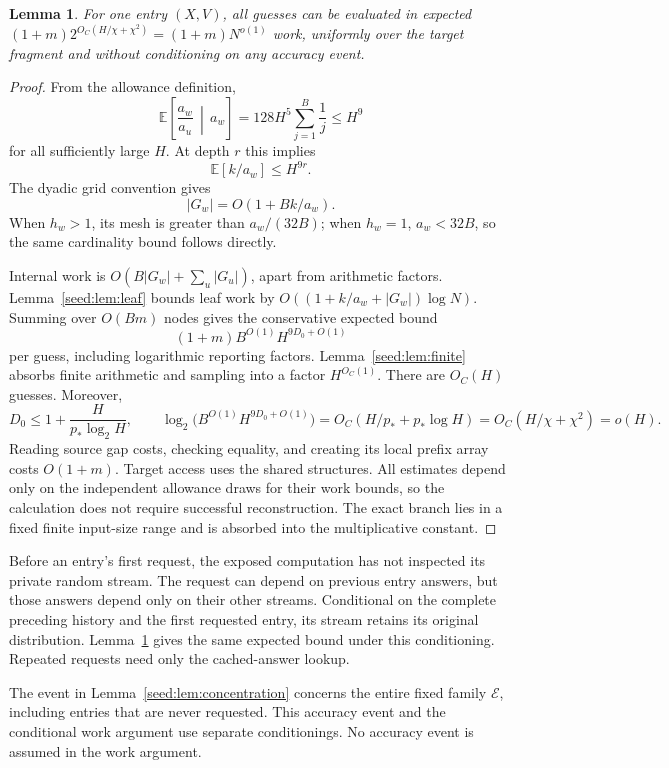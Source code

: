\documentclass[11pt]{article}
\newtheorem{lemma}[theorem]{Lemma}
\theoremstyle{definition}
\newcommand{\E}{\mathbb E}
\newcommand{\1}{\mathbf 1}
\begin{document}
\begin{lemma}\label{seed:lem:work}
For one entry $(X,V)$, all guesses can be evaluated in expected
$(1+m)2^{O_C(H/\chi+\chi^2)}=(1+m)N^{o(1)}$ work, uniformly over the
target fragment and without conditioning on any accuracy event.
\end{lemma}
\begin{proof}
From the allowance definition,
\[
 \E\left[\frac{a_w}{a_u}\,\middle|\,a_w\right]
 =128H^5\sum_{j=1}^B\frac1j\le H^9
\]
for all sufficiently large $H$. At depth $r$ this implies
\[
 \E[k/a_w]\le H^{9r}.
\]
The dyadic grid convention gives
\[
 |G_w|=O(1+Bk/a_w).
\]
When $h_w>1$, its mesh is greater than $a_w/(32B)$; when $h_w=1$,
$a_w<32B$, so the same cardinality bound follows directly.

Internal work is $O(B|G_w|+\sum_u|G_u|)$, apart from arithmetic factors.
Lemma~\ref{seed:lem:leaf} bounds leaf work by
$O((1+k/a_w+|G_w|)\log N)$. Summing over $O(Bm)$ nodes gives the
conservative expected bound
\[
 (1+m)B^{O(1)}H^{9D_0+O(1)}
\]
per guess, including logarithmic reporting factors.
Lemma~\ref{seed:lem:finite} absorbs finite arithmetic and sampling into
a factor $H^{O_C(1)}$. There are $O_C(H)$ guesses.
Moreover,
\[
 D_0\le1+\frac{H}{p_*\log_2 H},\qquad
 \log_2\bigl(B^{O(1)}H^{9D_0+O(1)}\bigr)
 =O_C(H/p_*+p_*\log H)
 =O_C(H/\chi+\chi^2)=o(H).
\]
Reading source gap costs, checking equality, and creating its local
prefix array costs $O(1+m)$. Target access uses the shared structures.
All estimates depend only on the independent allowance draws for their
work bounds, so the calculation does not require successful reconstruction.
The exact branch lies in a fixed finite input-size range and is absorbed
into the multiplicative constant.
\end{proof}

Before an entry's first request, the exposed computation has not
inspected its private random stream. The request can depend on previous
entry answers, but those answers depend only on their other streams.
Conditional on the complete preceding history and the first requested
entry, its stream retains its original distribution.
Lemma~\ref{seed:lem:work} gives the same expected bound under this
conditioning. Repeated requests need only the cached-answer lookup.

The event in Lemma~\ref{seed:lem:concentration} concerns the entire fixed
family $\mathcal E$, including entries that are never requested. This
accuracy event and the conditional work argument use separate
conditionings. No accuracy event is assumed in the work argument.
\end{document}
